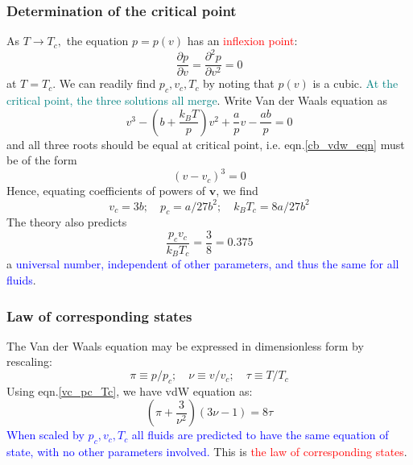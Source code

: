 \documentclass[12pt,titlepage]{article}
\newcommand{\redp}[1]{\textcolor{red}{#1}}
\newcommand{\bluep}[1]{\textcolor{blue}{#1}}
\newcommand{\tealp}[1]{\textcolor{teal}{#1}}
\numberwithin{equation}{section}
\begin{document}
\subsubsection{Determination of the critical point}
As $T \rightarrow T_{c},$ the equation $p=p(v)$ has an \redp{inflexion point}:
\begin{equation}
\frac{\partial p}{\partial v}=\frac{\partial^{2} p}{\partial v^{2}}=0
\end{equation}
at $T=T_c$. We can readily find $p_{c}, v_{c}, T_{c}$ by noting that $p(v)$ is a cubic. \tealp{At the critical point, the three solutions all merge}. Write Van der Waals equation as
\begin{equation}
\label{cb_vdw_eqn}
v^{3}-\left(b+\frac{k_{B} T}{p}\right) v^{2}+\frac{a}{p} v-\frac{a b}{p}=0
\end{equation}
and all three roots should be equal at critical point, i.e. eqn.\ref{cb_vdw_eqn} must be of the form
\begin{equation}
\left(v-v_{c}\right)^{3}=0
\end{equation}
Hence, equating coefficients of powers of $\boldsymbol{v}$, we find
\begin{equation}
\label{vc_pc_Tc}
v_{c}=3 b ; \quad p_{c}=a / 27 b^{2} ; \quad k_{B} T_{c}=8 a / 27 b^{2}
\end{equation}
The theory also predicts
\begin{equation}
\frac{p_{c} v_{c}}{k_{B} T_{c}}=\frac{3}{8}=0.375
\end{equation}
a \bluep{universal number, independent of other parameters, and thus the same for all fluids}.
\subsubsection{Law of corresponding states}
The Van der Waals equation may be expressed in dimensionless form by rescaling:
\begin{equation}
\pi \equiv p / p_{c} ; \quad \nu \equiv v / v_{c} ; \quad \tau \equiv T / T_{c}
\end{equation}
Using eqn.\ref{vc_pc_Tc}, we have vdW equation as:
\begin{equation}
\left(\pi+\frac{3}{\nu^{2}}\right)(3 \nu-1)=8 \tau
\end{equation}
\bluep{When scaled by $p_{c}, v_{c}, T_{c}$ all fluids are predicted to have the same equation of state, with no other parameters involved.} This is \redp{the law of corresponding states}.
\end{document}
